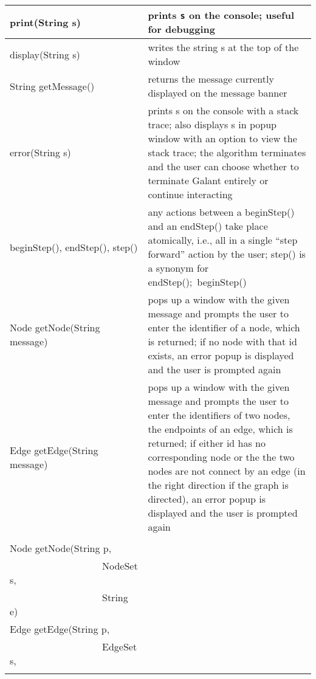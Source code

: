 \begin{table}
  \small
  \centering
  \begin{tabular}{| m{} | m{} |}
    \hline
    \textsf{print(String s)}
    &
    prints \texttt{s} on the console; useful for debugging
    \\ \hline
    \textsf{display(String s)}
    &
    writes the string \textsf{s} at the top of the window
    \\ \hline
    \textsf{String getMessage()}
    &
    returns the message currently displayed on the message banner
    \\ \hline
    \textsf{error(String s)}
    &
    prints \textsf{s} on the console with a stack trace; also displays
    \textsf{s} in popup window with an option to view the stack trace;
    the algorithm terminates and the user can choose whether to terminate
    Galant entirely or continue interacting
    \\ \hline
    \textsf{beginStep()},
    \textsf{endStep()}, \textsf{step()}
    &
    any actions between a \textsf{beginStep()} and an \textsf{endStep()}
    take place atomically, i.e.,
    all in a single ``step forward'' action by the user; \textsf{step()} is a
    synonym for \textsf{endStep();~beginStep()}
    \\ \hline
    \textsf{Node getNode(String message)}
    &
    pops up a window with the given message and prompts the user to enter the
    identifier of a node, which is returned;
    if no node with that id exists,
    an error popup is displayed and the user is prompted again
    \\ \hline
    \textsf{Edge getEdge(String message)}
    &
    pops up a window with the given message and prompts the user to enter the
    identifiers of two nodes, the endpoints of an edge, which is returned;
    if either id has no corresponding node or the the two nodes are not connect
    by an edge (in the right direction if the graph is directed),
    an error popup is displayed and the user is prompted again
    \\ \hline
    \shortstack[l] {
      \mbox{}
      \\[\smallskipamount]
      \textsf{Node getNode(String p,} \\
      \textsf{~~~~~~~~~~~~~~~~~~~NodeSet s,} \\
      \textsf{~~~~~~~~~~~~~~~~~~~String e)} \\
      \textsf{Edge getEdge(String p,} \\
      \textsf{~~~~~~~~~~~~~~~~~~~EdgeSet s,} \\
}
\end{tabular}
\end{table}
